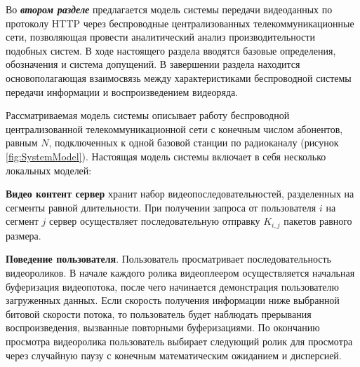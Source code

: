 

Во \textbf{\textit{втором разделе}} предлагается модель системы передачи видеоданных по протоколу HTTP через беспроводные централизованных телекоммуникационные сети, позволяющая провести аналитический анализ производительности подобных систем. В ходе настоящего раздела вводятся базовые определения, обозначения и система допущений. В завершении раздела находится основополагающая взаимосвязь между характеристиками беспроводной системы передачи информации и воспроизведением видеоряда.

Рассматриваемая модель системы описывает работу беспроводной централизованной телекоммуникационной сети с конечным числом абонентов, равным $N$, подключенных к одной базовой станции по радиоканалу (рисунок \ref{fig:SystemModel}). Настоящая модель системы включает в себя несколько локальных моделей: 

\textbf{Видео контент сервер} хранит набор видеопоследовательностей, разделенных на сегменты равной длительности. При получении запроса от пользователя $i$ на сегмент $j$ сервер осуществляет последовательную отправку $K_{i,j}$ пакетов равного размера.

\textbf{Поведение пользователя}. Пользователь просматривает последовательность видеороликов. В начале каждого ролика видеоплеером осуществляется начальная буферизация видеопотока, после чего начинается демонстрация пользователю загруженных данных. Если скорость получения информации ниже выбранной битовой скорости потока, то пользователь будет наблюдать прерывания воспроизведения, вызванные повторными буферизациями. По окончанию просмотра видеоролика пользователь выбирает следующий ролик для просмотра через случайную паузу с конечным математическим ожиданием и дисперсией. 

